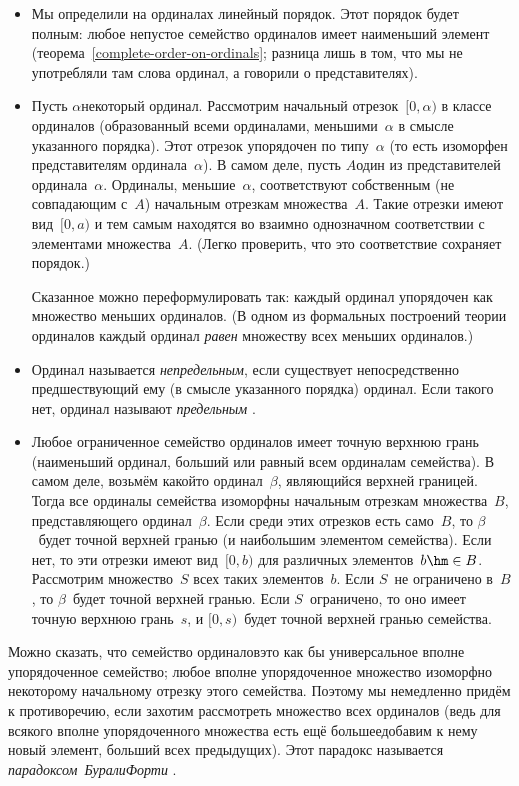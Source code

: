 \begin{itemize}
\item
Мы определили на ординалах линейный порядок. Этот порядок будет
полным: любое непустое семейство ординалов имеет наименьший
элемент (теорема~\ref{complete-order-on-ordinals}; разница лишь
в том, что мы не употребляли там слова  ординал, а
говорили о представителях).
\item
Пусть $\alpha$\т некоторый ординал. Рассмотрим начальный отрезок~$[0,\alpha)$
в классе ординалов (образованный всеми ординалами,
меньшими~$\alpha$ в смысле
указанного порядка). Этот отрезок
упорядочен по типу~$\alpha$ (то есть изоморфен представителям
ординала~$\alpha$). В самом деле, пусть $A$\т один из
представителей ординала~$\alpha$. Ординалы, меньшие~$\alpha$,
соответствуют собственным (не совпадающим с~$A$) начальным
отрезкам множества~$A$. Такие отрезки имеют вид~$[0,a)$ и тем
самым находятся во взаимно однозначном соответствии с
элементами множества~$A$. (Легко проверить, что это соответствие
сохраняет порядок.)

Сказанное можно переформулировать так: каждый ординал упорядочен
как множество меньших ординалов. (В одном из формальных
построений теории ординалов каждый ординал \textsl{равен}
множеству всех меньших ординалов.)
\item
Ординал называется \emph{непредельным},
если существует
непосредственно предшествующий ему (в смысле указанного порядка)
ординал. Если такого нет, ординал называют \emph{предельным}%
.
\item
Любое ограниченное семейство ординалов имеет точную верхнюю
грань (наименьший ординал, больший или равный всем ординалам
семейства). В самом деле, возьмём какой\д то ординал~$\beta$,
являющийся верхней границей. Тогда все ординалы семейства
изоморфны начальным отрезкам множества~$B$, представляющего
ординал~$\beta$. Если среди этих отрезков есть само~$B$, то
$\beta$~будет точной верхней гранью (и наибольшим элементом
семейства). Если нет, то эти отрезки имеют вид~$[0,b)$ для
различных элементов~$b\hm\in B$. Рассмотрим множество~$S$ всех
таких элементов~$b$. Если $S$~не ограничено в~$B$, то $\beta$~будет
точной верхней гранью. Если $S$~ограничено, то оно имеет
точную верхнюю грань~$s$, и $[0,s)$~будет точной верхней гранью
семейства.
\end{itemize}

Можно сказать, что семейство ординалов\т это как бы
универсальное вполне упорядоченное семейство; любое
вполне упорядоченное множество изоморфно некоторому
начальному отрезку этого семейства. Поэтому
мы немедленно придём к противоречию, если захотим рассмотреть
множество всех ординалов (ведь для всякого вполне упорядоченного
множества есть ещё большее\т добавим к нему новый элемент,
больший всех предыдущих). Этот парадокс называется
\emph{парадоксом~Бурали\д Форти}%
.

